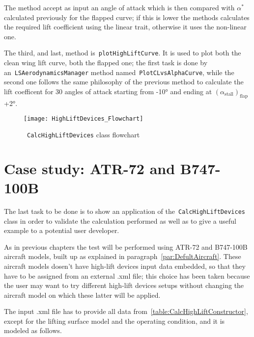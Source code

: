 The method accept as input an angle of attack which is then compared with $\alpha^*$ calculated previously for the flapped curve; if this is lower the methods calculates the required lift coefficient using the linear trait, otherwise it uses the non-linear one.

\bigskip
\noindent
The third, and last, method is~\lstinline[language=Java]!plotHighLiftCurve!. It is used to plot both the clean wing lift curve, both the flapped one; the first task is done by an~\lstinline[language=Java]!LSAerodynamicsManager! method named~\lstinline[language=Java]!PlotCLvsAlphaCurve!, while the second one follows the same philosophy of the previous method to calculate the lift coefficent for 30 angles of attack starting from -10° and ending at $\left(\alpha_{\text{stall}}\right)_{\text{flap}}$+2°.

\begin{figure}[H]
  \centering
  \texttt{[image: HighLiftDevices\_Flowchart]}
  \caption{~\lstinline[language=Java]!CalcHighLiftDevices! class flowchart}
  \label{fig:CalcHighLiftFlowchart}
\end{figure}

\section{Case study: ATR-72 and B747-100B}
The last task to be done is to show an application of the~\lstinline[language=Java]!CalcHighLiftDevices! class in order to validate the calculation performed as well as to give a useful example to a potential user developer. 

As in previous chapters the test will be performed using ATR-72 and B747-100B aircraft models, built up as explained in paragraph~\ref{par:DefultAircraft}. These aircraft models dosen't have high-lift devices input data embedded, so that they have to be assigned from an external .xml file; this choice has been taken because the user may want to try different high-lift devices setups without changing the aircraft model on which these latter will be applied.

The input .xml file\cite{wiki:xml} has to provide all data from~\ref{table:CalcHighLiftConstructor}, except for the lifting surface model and the operating condition, and it is modeled as follows.

